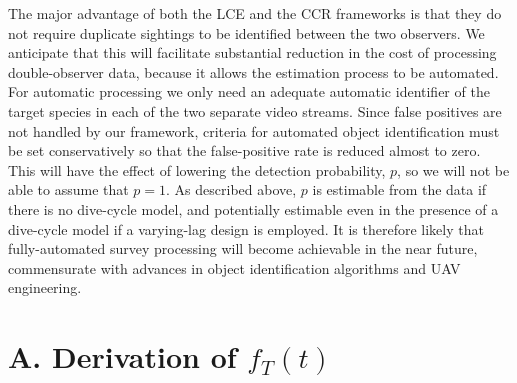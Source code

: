 \documentclass[useAMS, usenatbib, referee]{biom}\usepackage[]{graphicx}\usepackage[]{color}
\begin{document}

The major advantage of both the LCE and the CCR frameworks is that they do not require duplicate sightings to be identified between the two observers. We anticipate that this will facilitate substantial reduction in the cost of processing double-observer data, because it allows the estimation process to be automated. For automatic processing we only need an adequate automatic identifier of the target species in each of the two separate video streams. Since false positives are not handled by our framework, criteria for automated object identification must be set conservatively so that the false-positive rate is reduced almost to zero. This will have the effect of lowering the detection probability, $p$, so we will not be able to assume that $p=1$. As described above, $p$ is estimable from the data if there is no dive-cycle model, and potentially estimable even in the presence of a dive-cycle model if a varying-lag design is employed. It is therefore likely that fully-automated survey processing will become achievable in the near future, commensurate with advances in object identification algorithms and UAV engineering.




\appendix

\section{A. Derivation of $f_{T}(t)$}
\label{appx:firstpassage}
\end{document}
